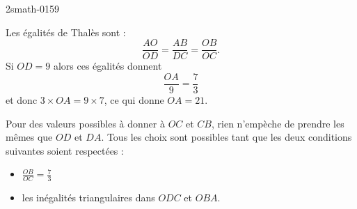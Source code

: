 
\begin{corrige}{2smath-0159}

    Les égalités de Thalès sont :
    \begin{equation}
        \frac{ AO }{ OD }=\frac{ AB }{ DC }=\frac{ OB }{ OC }.
    \end{equation}
    Si \( OD=9\) alors ces égalités donnent
    \begin{equation}
        \frac{ OA }{ 9 }=\frac{ 7 }{ 3 }
    \end{equation}
    et donc \( 3\times OA=9\times 7\), ce qui donne \( OA=21\).

    Pour des valeurs possibles à donner à \( OC\) et \( CB\), rien n'empèche de prendre les mêmes que \( OD\) et \( DA\). Tous les choix sont possibles tant que les deux conditions suivantes soient respectées :
    \begin{itemize}
        \item \( \frac{ OB }{ OC }=\frac{ 7 }{ 3 }\)
        \item les inégalités triangulaires dans \( ODC\) et \( OBA\).
    \end{itemize}

\end{corrige}
